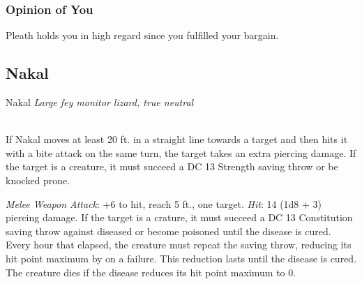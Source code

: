 \documentclass[letterpaper,10pt,twoside,twocolumn,openany]{book}
\begin{document}
\subsubsection{Opinion of You}
Pleath holds you in high regard since you fulfilled your bargain.


\subsection{ Nakal}

\begin{monsterbox}{ Nakal}
	\textit{Large fey monitor lizard, true neutral}\\
	\hline%
	\basics[%
	armorclass = 12 (natural armor),
	hitpoints  = \dice{6d8 + 12},
	speed      = {35 ft.}
	]
	\hline%
	\stats[
    STR = \stat{17}, %
    DEX = \stat{11},
    CON = \stat{16},
    INT = \stat{5},
    WIS = \stat{13},
    CHA = \stat{5}
	]
	\hline%
	\details[%
	skills = {Athletics + 3},
	senses = {pp 11},
	languages = {Monitor Lizard, understands Common and Sylvan but cannot speak},
	challenge = 1
	]
	\hline \\[1mm]
	\begin{monsteraction}[Charge]
		If Nakal moves at least 20 ft. in a straight line towards a target and then hits it with a bite attack on the same turn, the target takes an extra  piercing damage.
		If the target is a creature, it must succeed a DC 13 Strength saving throw or be knocked prone.
	\end{monsteraction}
	
	\begin{monsteraction}[Bite]
		\emph{Melee Weapon Attack}: +6 to hit, reach 5 ft., one target. \emph{Hit}: 14 (1d8 + 3) piercing damage.
		If the target is a crature, it must succeed a DC 13 Constitution saving throw against diseased or become poisoned until the disease is cured.  
		Every hour that elapsed, the creature must repeat the saving throw, reducing its hit point maximum by  on a failure. 
		This reduction lasts until the disease is cured. 
		The creature dies if the disease reduces its hit point maximum to 0.
	\end{monsteraction}
	
\end{monsterbox}
\end{document}
